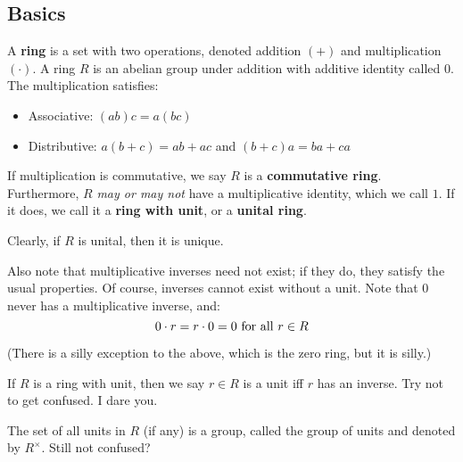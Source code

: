 \subsection{Basics}

\begin{defn}
    A \textbf{ring} is a set with two operations, denoted addition $ (+) $ and
    multiplication $ (\cdot) $. \vsp
    A ring $ R $ is an abelian group under addition with additive identity called $ 0 $.
    The multiplication satisfies:
    \begin{itemize}
        \item Associative: $ (ab)c = a(bc) $
        \item Distributive: $ a(b + c) = ab + ac$ and $ (b + c)a = ba + ca $
    \end{itemize}
    If multiplication is commutative, we say $ R $ is a \textbf{commutative ring}. \vsp
    Furthermore, $ R $ \textit{may or may not} have a multiplicative identity, which we call $ 1 $.
    If it does, we call it a \textbf{ring with unit}, or a \textbf{unital ring}.
\end{defn}

Clearly, if $ R $ is unital, then it is unique.

Also note that multiplicative inverses need not exist;
if they do, they satisfy the usual properties.
Of course, inverses cannot exist without a unit.
Note that $ 0 $ never has a multiplicative inverse, and:
\begin{equation*}
    0 \cdot r = r \cdot 0 = 0 \textrm{ for all } r \in R
\end{equation*}

(There is a silly exception to the above, which is the zero ring, but it is silly.)

\begin{defn}
    If $ R $ is a ring with unit, then we say $ r \in R $ is a unit iff $ r $ has an inverse. \vsp
    Try not to get confused. I dare you.
\end{defn}

\begin{thm}
    The set of all units in $ R $ (if any) is a group, called the group of units and denoted by
    $ R^{\times} $. \vsp
    Still not confused?
\end{thm}

